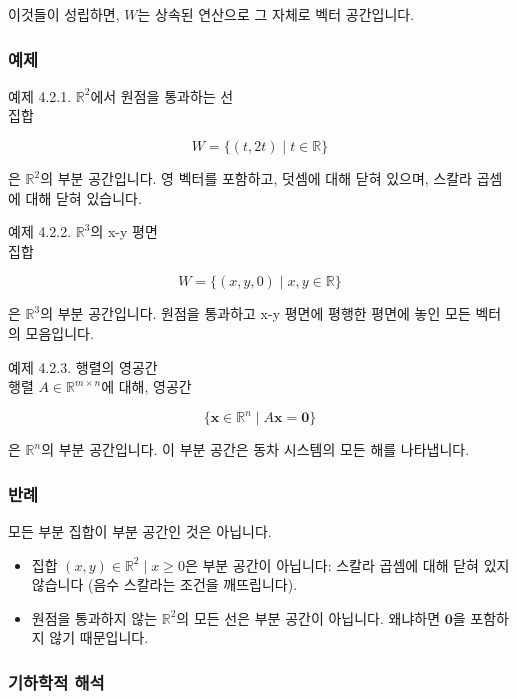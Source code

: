 \documentclass[
  12pt,
  a4paper,
]{article}
\begin{document}
이것들이 성립하면, \(W\)는 상속된 연산으로 그 자체로 벡터 공간입니다.

\subsubsection{예제}\label{examples-3}

예제 4.2.1. \(\mathbb{R}^2\)에서 원점을 통과하는 선\\
집합

\[W = \{ (t, 2t) \mid t \in \mathbb{R} \}\]

은 \(\mathbb{R}^2\)의 부분 공간입니다. 영 벡터를 포함하고, 덧셈에 대해 닫혀 있으며, 스칼라 곱셈에 대해 닫혀 있습니다.

예제 4.2.2. \(\mathbb{R}^3\)의 x-y 평면\\
집합

\[W = \{ (x, y, 0) \mid x,y \in \mathbb{R} \}\]

은 \(\mathbb{R}^3\)의 부분 공간입니다. 원점을 통과하고 x-y 평면에 평행한 평면에 놓인 모든 벡터의 모음입니다.

예제 4.2.3. 행렬의 영공간\\
행렬 \(A \in \mathbb{R}^{m \times n}\)에 대해, 영공간

\[\{ \mathbf{x} \in \mathbb{R}^n \mid A\mathbf{x} = \mathbf{0} \}\]

은 \(\mathbb{R}^n\)의 부분 공간입니다. 이 부분 공간은 동차 시스템의 모든 해를 나타냅니다.

\subsubsection{반례}\label{non-examples-2}

모든 부분 집합이 부분 공간인 것은 아닙니다.

\begin{itemize}
\item
  집합 \({ (x,y) \in \mathbb{R}^2 \mid x \geq 0 }\)은 부분 공간이 아닙니다: 스칼라 곱셈에 대해 닫혀 있지 않습니다 (음수 스칼라는 조건을 깨뜨립니다).
\item
  원점을 통과하지 않는 \(\mathbb{R}^2\)의 모든 선은 부분 공간이 아닙니다. 왜냐하면 \(\mathbf{0}\)을 포함하지 않기 때문입니다.
\end{itemize}

\subsubsection{기하학적 해석}\label{geometric-interpretation-5}
\end{document}
